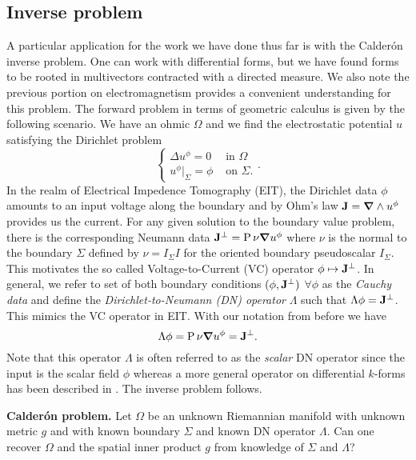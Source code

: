 \subsection{Inverse problem}

A particular application for the work we have done thus far is with the Calder\'on inverse problem. One can work with differential forms, but we have found forms to be rooted in multivectors contracted with a directed measure.  We also note the previous portion on electromagnetism provides a convenient understanding for this problem. The forward problem in terms of geometric calculus is given by the following scenario. We have an ohmic $\Omega$ and we find the electrostatic potential $u$ satisfying the Dirichlet problem
\begin{equation}
\label{eq:dirichlet_problem}
\begin{cases} \Delta u^\phi = 0 & \textrm{ in $\Omega$} \\  u^\phi \vert_\Sigma = \phi & \textrm{ on $\Sigma$}. \end{cases}.
\end{equation}
In the realm of Electrical Impedence Tomography (EIT), the Dirichlet data $\phi$ amounts to an input voltage along the boundary and by Ohm's law $\mathbf{J}=\boldsymbol{\nabla} \wedge u^\phi$ provides us the current. For any given solution to the boundary value problem, there is the corresponding Neumann data $\mathbf{J}^\perp=\operatorname{P}{\nu}{\boldsymbol{\nabla} u^\phi}$ where $\nu$ is the normal to the boundary $\Sigma$ defined by $\nu = I_\Sigma I$ for the oriented boundary pseudoscalar $I_\Sigma$. This motivates the so called Voltage-to-Current (VC) operator $\phi \mapsto \mathbf{J}^\perp$. In general, we refer to set of both boundary conditions $(\phi, \mathbf{J}^\perp)$ $\forall \phi$ as the \emph{Cauchy data} and define the \emph{Dirichlet-to-Neumann (DN) operator} $\Lambda$ such that $\Lambda \phi = \mathbf{J}^\perp$. This mimics the VC operator in EIT. With our notation from before we have
\[
\Lambda \phi = \operatorname{P}{\nu}{\boldsymbol{\nabla} u^\phi} = \mathbf{J}^\perp.
\] 
Note that this operator $\Lambda$ is often referred to as the \emph{scalar} DN operator since the input is the scalar field $\phi$ whereas a more general operator on differential $k$-forms has been described in \cite{belishev_dirichlet_2008,sharafutdinov_complete_2013}. The inverse problem follows.

\vspace*{5pt}
\noindent\textbf{Calder\'on problem.} Let $\Omega$ be an unknown Riemannian manifold with unknown metric $g$ and with known boundary $\Sigma$ and known DN operator $\Lambda$. Can one recover $\Omega$ and the spatial inner product $g$ from knowledge of $\Sigma$ and $\Lambda$?
\vspace*{5pt}

